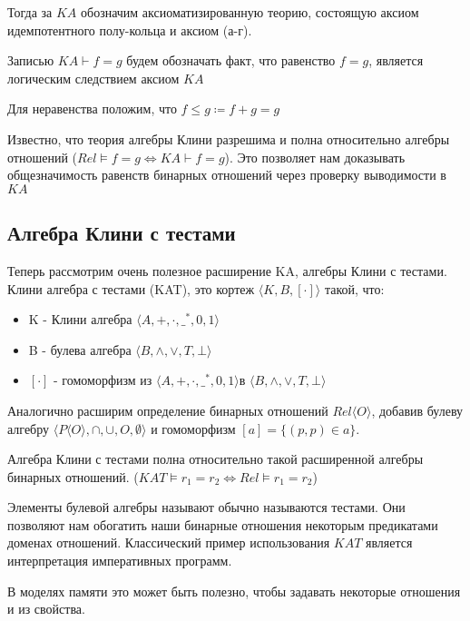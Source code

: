 \documentclass[times
              ]{itmo-student-thesis}
\begin{document}
      Тогда за $ \mathit{KA} $ обозначим аксиоматизированную теорию, состоящую аксиом идемпотентного полу-кольца и аксиом (а-г).

      Записью $ \mathit{KA} \vdash f = g $ будем обозначать факт, что равенство $ f = g $, является логическим следствием аксиом $ \mathit{KA} $

      Для неравенства положим, что $ f \leq g \coloneqq f + g = g$

      Известно, что теория алгебры Клини разрешима и полна относительно алгебры отношений
      ($ Rel \models f = g \Leftrightarrow \mathit{KA} \vdash f = g$). Это позволяет нам доказывать общезначимость равенств бинарных отношений через проверку выводимости в $ \mathit{KA} $

    \subsection{Алгебра Клини с тестами}
      Теперь рассмотрим очень полезное расширение KA, алгебры Клини с тестами.
      Клини алгебра с тестами (KAT), это кортеж $\langle K, B, [\cdot] \rangle$ такой, что:

      \begin{itemize}
        \item K - Клини алгебра $\langle A, +, \cdot, \_^*, 0, 1 \rangle $
        \item B - булева алгебра $\langle B, \wedge, \vee, T, \bot \rangle $
        \item $ [\cdot] $ - гомоморфизм из $\langle A, +, \cdot, \_^*, 0, 1 \rangle  $в $\langle B, \wedge, \vee, T, \bot \rangle$
      \end{itemize}

      Аналогично расширим определение бинарных отношений $Rel \langle O \rangle $, добавив булеву алгебру $\langle P\langle O \rangle, \cap, \cup, O, \emptyset \rangle$ и гомоморфизм $ [a] = \{(p, p) \in a\} $.

      Алгебра Клини с тестами полна относительно такой расширенной алгебры бинарных отношений.
      ($KAT \models r_1 = r_2 \Leftrightarrow Rel \models r_1 = r_2$)

      Элементы булевой алгебры называют обычно называются тестами. Они позволяют нам обогатить наши бинарные отношения некоторым предикатами доменах отношений. Классический пример использования $ \mathit{KAT} $ является интерпретация императивных программ.

      В моделях памяти это может быть полезно, чтобы задавать некоторые отношения и из свойства.
\end{document}
